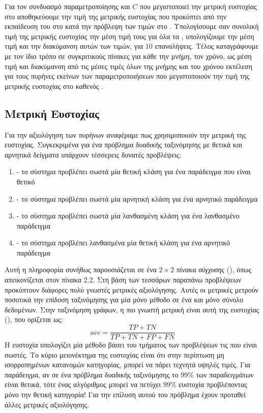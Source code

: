 Για τον συνδυασμό παραμετροποίησης και $C$ που μεγιστοποιεί την μετρική ευστοχίας στο  αποθηκεύουμε την τιμή της μετρικής ευστοχίας που προκύπτει από την εκπαίδευση του  στο  κατά την πρόβλεψη των τιμών στο .
Υπολογίσουμε σαν συνολική τιμή της μετρικής ευστοχίας την μέση τιμή τους για όλα τα , υπολογίζουμε την μέση τιμή και την διακύμανση αυτών των τιμών, για $10$ επαναλήψεις.
Τέλος καταγράφουμε με τον ίδιο τρόπο σε συγκριτικούς πίνακες για κάθε  την μνήμη, τον χρόνο, ως μέση τιμή και διακύμανση από τις μέσες τιμές όλων της μνήμης και του χρόνου εκτέλεση για τους πυρήνες εκείνων των παραμετροποιήσεων που μεγιστοποιούν την τιμή της μετρικής ευστοχίας στο  καθενός .

\subsection{Μετρική Ευστοχίας}
\label{subsection:accuracy}
Για την αξιολόγηση των πυρήνων αναφέραμε πως χρησιμοποιούν την μετρική της ευστοχίας.
Συγκεκριμένα για ένα πρόβλημα δυαδικής ταξινόμησης με θετικά και αρνητικά δείγματα υπάρχουν τέσσερεις δυνατές προβλέψεις:
\begin{enumerate}
    \item {} - το σύστημα προβλέπει σωστά μία θετική κλάση για ένα παράδειγμα που είναι θετικό
    \item {} - το σύστημα προβλέπει σωστά μία αρνητική κλάση για ένα αρνητικό παράδειγμα
    \item {} - το σύστημα προβλέπει σωστά μία λανθασμένη κλάση για ένα λανθασμένο παράδειγμα
    \item {} - το σύστημα προβλέπει λανθασμένα μία θετική κλάση για ένα αρνητικό παράδειγμα
\end{enumerate}
Αυτή η πληροφορία συνήθως παρουσιάζεται σε ένα $2 \times 2$ πίνακα \textit{σύγχυσης} (), όπως απεικονίζεται στον πίνακα 2.2.
Στη βάση των τεσσάρων παραπάνω προβλέψεων προκύπτουν διάφορες πολύ γνωστές μετρικές αξιολόγησης.
Αυτές οι μετρικές μετρούν ποσοτικά την επίδοση ταξινόμησης για μία μόνο μέθοδο σε ένα και μόνο σύνολο δεδομένων.
Στην ταξινόμηση γράφων, η πιο γνωστή μετρική είναι αυτή της ευστοχίας (), που ορίζεται ως:
\begin{equation}
    acc = \frac{TP + TN}{TP + TN + FP + FN}    
\end{equation}
Η ευστοχία υπολογίζει μία μέθοδο βάσει του τμήματος των προβλέψεων τις που είναι σωστές.
Το κύριο μειονέκτημα της ευστοχίας είναι ότι στην περίπτωση μη ισορροπημένων κατανομών κατηγορίας, μπορεί να πάρει τεχνητά υψηλές τιμές.
Για παράδειγμα, αν σε ένα πρόβλημα δυαδικής ταξινόμησης το $99$\% των παραδειγμάτων είναι θετικά, τότε ένας αλγόριθμος μπορεί να πετύχει $99$\% ευστοχία προβλέποντας μόνο την θετική κατηγορία!
Για την επίλυση αυτού του πρόβλημα έχουν προταθεί άλλες μετρικές αξιολόγησης.

